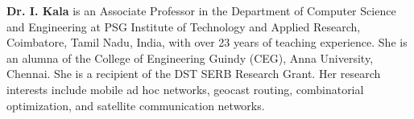 \documentclass[a4paper,fleqn]{cas-dc}
\begin{document}
{\bf Dr. I. Kala} is an Associate Professor in the Department of Computer Science and Engineering at PSG Institute of Technology and Applied Research, Coimbatore, Tamil Nadu, India, with over 23 years of teaching experience. She is an alumna of the College of Engineering Guindy (CEG), Anna University, Chennai. She is a recipient of the DST SERB Research Grant. Her research interests include mobile ad hoc networks, geocast routing, combinatorial optimization, and satellite communication networks.
\endbio
\end{document}
